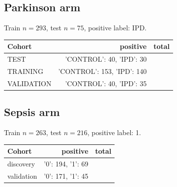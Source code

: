 \subsection{Parkinson arm}
Train $n=293$, test $n=75$, positive label: IPD.
\begin{center}\begin{tabular}{lrr} \toprule Cohort & positive & total \\ \midrule
TEST & {'CONTROL': 40, 'IPD': 30} &  \\
TRAINING & {'CONTROL': 153, 'IPD': 140} &  \\
VALIDATION & {'CONTROL': 40, 'IPD': 35} &  \\
\bottomrule\end{tabular}\end{center}
\subsection{Sepsis arm}
Train $n=263$, test $n=216$, positive label: 1.
\begin{center}\begin{tabular}{lrr} \toprule Cohort & positive & total \\ \midrule
discovery & {'0': 194, '1': 69} &  \\
validation & {'0': 171, '1': 45} &  \\
\bottomrule\end{tabular}\end{center}
